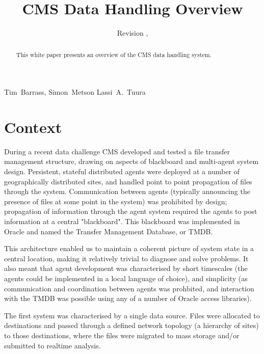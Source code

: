 \documentclass{cmspaper}
\begin{document}
\begin{titlepage}
  \whitepaper
  \date{Revision \RCSRevision, \RCSDate}
  \title{CMS Data Handling Overview}

  \begin{Authlist}
    Tim~Barrass, Simon~Metson
    Lassi~A.~Tuura
  \end{Authlist}

  \begin{abstract}
    This white paper presents an overview of the CMS data handling system.
  \end{abstract} 

\end{titlepage}

\setcounter{page}{2}

\section{Context}
During a recent data challenge CMS developed and tested a file transfer management structure, drawing on aspects of blackboard and multi-agent system design. Persistent, stateful distributed agents were deployed at a number of geographically distributed sites, and handled point to point propagation of files through the system. Communication between agents (typically announcing the presence of files at some point in the system) was prohibited by design; propagation of information through the agent system required the agents to post information at a central "blackboard". This blackboard was implemented in Oracle and named the Transfer Management Database, or TMDB. 

This architecture enabled us to maintain a coherent picture of system state in a central location, making it relatively trivial to diagnose and solve problems. It also meant that agent development was characterised by short timescales (the agents could be implemented in a local language of choice), and simplicity (as communication and coordination between agents was prohbited, and interaction with the TMDB was possible using any of a number of Oracle access libraries).

The first system was characterised by a single data source. Files were allocated to destinations and passed through a defined network topology (a hierarchy of sites) to those destinations, where the files were migrated to mass storage and/or submitted to realtime analysis.
\end{document}
